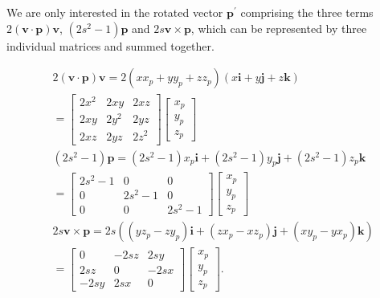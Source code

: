 \documentclass[10pt]{article}
\begin{document}
We are only interested in the rotated vector $\mathbf{p}^{\prime}$ comprising the three terms $2(\mathbf{v} \cdot \mathbf{p}) \mathbf{v}$, $\left(2 s^{2}-1\right) \mathbf{p}$ and $2 s \mathbf{v} \times \mathbf{p}$, which can be represented by three individual matrices and summed together.

$$
\begin{aligned}
& 2(\mathbf{v} \cdot \mathbf{p}) \mathbf{v}=2\left(x x_{p}+y y_{p}+z z_{p}\right)(x \mathbf{i}+y \mathbf{j}+z \mathbf{k}) \\
& =\left[\begin{array}{ccc}
2 x^{2} & 2 x y & 2 x z \\
2 x y & 2 y^{2} & 2 y z \\
2 x z & 2 y z & 2 z^{2}
\end{array}\right]\left[\begin{array}{l}
x_{p} \\
y_{p} \\
z_{p}
\end{array}\right] \\
& \left(2 s^{2}-1\right) \mathbf{p}=\left(2 s^{2}-1\right) x_{p} \mathbf{i}+\left(2 s^{2}-1\right) y_{p} \mathbf{j}+\left(2 s^{2}-1\right) z_{p} \mathbf{k} \\
& =\left[\begin{array}{ccc}
2 s^{2}-1 & 0 & 0 \\
0 & 2 s^{2}-1 & 0 \\
0 & 0 & 2 s^{2}-1
\end{array}\right]\left[\begin{array}{l}
x_{p} \\
y_{p} \\
z_{p}
\end{array}\right] \\
& 2 s \mathbf{v} \times \mathbf{p}=2 s\left(\left(y z_{p}-z y_{p}\right) \mathbf{i}+\left(z x_{p}-x z_{p}\right) \mathbf{j}+\left(x y_{p}-y x_{p}\right) \mathbf{k}\right) \\
& =\left[\begin{array}{ccc}
0 & -2 s z & 2 s y \\
2 s z & 0 & -2 s x \\
-2 s y & 2 s x & 0
\end{array}\right]\left[\begin{array}{l}
x_{p} \\
y_{p} \\
z_{p}
\end{array}\right] \text {. }
\end{aligned}
$$
\end{document}
